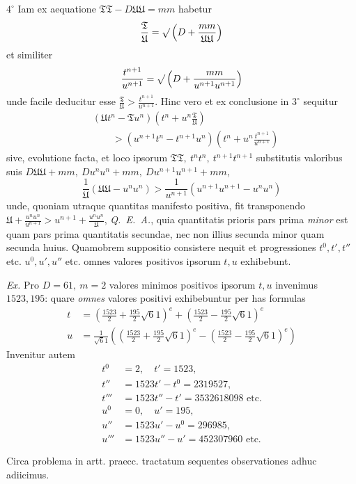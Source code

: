 \(4^\circ\) Iam ex aequatione \(\mathfrak{TT}-D\mathfrak{UU}=mm\) habetur
\[
\frac{\mathfrak{T}}{\mathfrak{U}}=\surd\left(D+\frac{mm}{\mathfrak{UU}}\right)
\]
et similiter
\[
\frac{t^{n+1}}{u^{n+1}}=\surd\left(D+\frac{mm}{u^{n+1}u^{n+1}}\right)
\]
unde facile deducitur esse \(\frac{\mathfrak{T}}{\mathfrak{U}}>\frac{t^{n+1}}{u^{n+1}}\). Hinc vero et ex conclusione in \(3^\circ\) sequitur
\[
\begin{aligned}&(\mathfrak{U}t^n-\mathfrak{T}u^n)\left(t^n+u^n\frac{\mathfrak{T}}{\mathfrak{U}}\right)\\&\qquad>(u^{n+1}t^n-t^{n+1}u^n)\left(t^n+u^n\frac{t^{n+1}}{u^{n+1}}\right)\end{aligned}
\]
sive, evolutione facta, et loco ipsorum \(\mathfrak{TT},\ t^n t^n,\ t^{n+1}t^{n+1}\) substitutis valoribus suis \(D\mathfrak{UU}+mm,\ Du^n u^n+mm,\ Du^{n+1}u^{n+1}+mm\),
\[
\frac1{\mathfrak{U}}(\mathfrak{UU}-u^n u^n)>\frac1{u^{n+1}}(u^{n+1}u^{n+1}-u^n u^n)
\]
unde, quoniam utraque quantitas manifesto positiva, fit transponendo \(\mathfrak{U}+\frac{u^n u^n}{u^{n+1}}>u^{n+1}+\frac{u^n u^n}{\mathfrak{U}}\), \textit{Q.~E.~A.}, quia quantitatis prioris pars prima \textit{minor} est
quam pars prima quantitatis secundae, nec non illius secunda minor quam secunda huius. Quamobrem suppositio consistere nequit et progressiones \(t^0,t',t''\) etc. \(u^0,u',u''\) etc. omnes valores positivos ipsorum \(t,u\) exhibebunt.

\textit{Ex.} Pro \(D=61,\ m=2\) valores minimos positivos ipsorum \(t,u\) invenimus \(1523,195\): quare \textit{omnes} valores positivi exhibebuntur per has formulas
\[
\begin{aligned}
t&=\left(\frac{1523}{2}+\frac{195}{2}\surd61\right)^e+\left(\frac{1523}{2}-\frac{195}{2}\surd61\right)^e\\
u&=\frac1{\surd61}\left(\left(\frac{1523}{2}+\frac{195}{2}\surd61\right)^e-\left(\frac{1523}{2}-\frac{195}{2}\surd61\right)^e\right)
\end{aligned}
\]
Invenitur autem
\[
\begin{aligned}
t^0&=2,\quad t'=1523,\\
t''&=1523t'-t^0=2319527,\\
t'''&=1523t''-t'=3532618098\text{ etc.}\\
u^0&=0,\quad u'=195,\\
u''&=1523u'-u^0=296985,\\
u'''&=1523u''-u'=452307960\text{ etc.}
\end{aligned}
\]

Circa problema in artt. praecc. tractatum sequentes observationes adhuc adiicimus.

